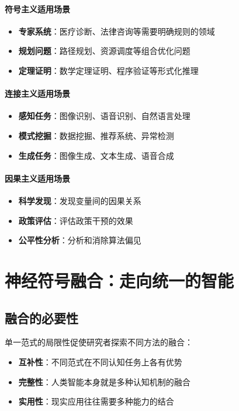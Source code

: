\paragraph{符号主义适用场景}
\begin{itemize}
\item \textbf{专家系统}：医疗诊断、法律咨询等需要明确规则的领域
\item \textbf{规划问题}：路径规划、资源调度等组合优化问题
\item \textbf{定理证明}：数学定理证明、程序验证等形式化推理
\end{itemize}

\paragraph{连接主义适用场景}
\begin{itemize}
\item \textbf{感知任务}：图像识别、语音识别、自然语言处理
\item \textbf{模式挖掘}：数据挖掘、推荐系统、异常检测
\item \textbf{生成任务}：图像生成、文本生成、语音合成
\end{itemize}

\paragraph{因果主义适用场景}
\begin{itemize}
\item \textbf{科学发现}：发现变量间的因果关系
\item \textbf{政策评估}：评估政策干预的效果
\item \textbf{公平性分析}：分析和消除算法偏见
\end{itemize}

\section{神经符号融合：走向统一的智能}

\subsection{融合的必要性}

单一范式的局限性促使研究者探索不同方法的融合：

\begin{itemize}
\item \textbf{互补性}：不同范式在不同认知任务上各有优势
\item \textbf{完整性}：人类智能本身就是多种认知机制的融合
\item \textbf{实用性}：现实应用往往需要多种能力的结合
\end{itemize}

